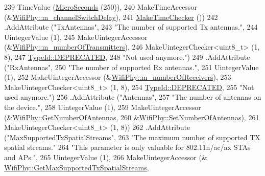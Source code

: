 \begin{DoxyCode}
239                    TimeValue (\hyperlink{group__timecivil_ga17465a639c8d1464e76538afdd78a9f0}{MicroSeconds} (250)),
240                    MakeTimeAccessor (&\hyperlink{classns3_1_1WifiPhy_a138b7bdd10dd952ebab47eb7c8e1ad11}{WifiPhy::m\_channelSwitchDelay}),
241                    \hyperlink{group__time_ga7032965bd4afa578691d88c09e4481c1}{MakeTimeChecker} ())
242     .AddAttribute (\textcolor{stringliteral}{"TxAntennas"},
243                    \textcolor{stringliteral}{"The number of supported Tx antennas."},
244                    UintegerValue (1),
245                    MakeUintegerAccessor (&\hyperlink{classns3_1_1WifiPhy_a332193b00d6a840263ba8e1c7661bb31}{WifiPhy::m\_numberOfTransmitters}),
246                    MakeUintegerChecker<uint8\_t> (1, 8),
247                    \hyperlink{classns3_1_1TypeId_ad55d31e57490a83a3ededa096a8d2588aa50cc8669d91c8449f81557ffa5d2024}{TypeId::DEPRECATED},
248                    \textcolor{stringliteral}{"Not used anymore."})
249     .AddAttribute (\textcolor{stringliteral}{"RxAntennas"},
250                    \textcolor{stringliteral}{"The number of supported Rx antennas."},
251                    UintegerValue (1),
252                    MakeUintegerAccessor (&\hyperlink{classns3_1_1WifiPhy_a2fca337488695e8f4e35813505184b4b}{WifiPhy::m\_numberOfReceivers}),
253                    MakeUintegerChecker<uint8\_t> (1, 8),
254                    \hyperlink{classns3_1_1TypeId_ad55d31e57490a83a3ededa096a8d2588aa50cc8669d91c8449f81557ffa5d2024}{TypeId::DEPRECATED},
255                    \textcolor{stringliteral}{"Not used anymore."})
256     .AddAttribute (\textcolor{stringliteral}{"Antennas"},
257                    \textcolor{stringliteral}{"The number of antennas on the device."},
258                    UintegerValue (1),
259                    MakeUintegerAccessor (&\hyperlink{classns3_1_1WifiPhy_ae23367ac8e1424724f95df441e0cd278}{WifiPhy::GetNumberOfAntennas},
260                                          &\hyperlink{classns3_1_1WifiPhy_a00b11fc081f04ec36bc814c50861e34f}{WifiPhy::SetNumberOfAntennas}),
261                    MakeUintegerChecker<uint8\_t> (1, 8))
262     .AddAttribute (\textcolor{stringliteral}{"MaxSupportedTxSpatialStreams"},
263                    \textcolor{stringliteral}{"The maximum number of supported TX spatial streams."}
264                    \textcolor{stringliteral}{"This parameter is only valuable for 802.11n/ac/ax STAs and APs."},
265                    UintegerValue (1),
266                    MakeUintegerAccessor (&
      \hyperlink{classns3_1_1WifiPhy_ab5e6bb95a75d0e6e7e666efd3c014fe4}{WifiPhy::GetMaxSupportedTxSpatialStreams},

\end{DoxyCode}

